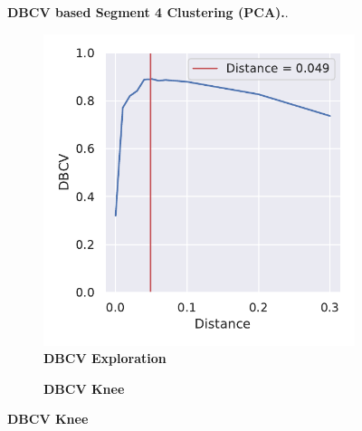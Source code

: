 \begin{figure}[!hbt]
\begin{subfigure}[b]{0.475\textwidth}
    \end{subfigure}
    \caption[\Acrshort{DBCV} based Segment 4 Clustering (\Acrshort{PCA})]{\textbf{\Acrshort{DBCV} based Segment 4 Clustering (\Acrshort{PCA}).}.}
    \label{fig:PCA_Cluster_DBCV_4}
\end{figure}

\begin{figure}[!hbt]
    \centering
    \begin{subfigure}[b]{0.475\textwidth}
        \caption[\Acrshort{DBCV} Exploration]{\textbf{\Acrshort{DBCV} Exploration}}
        \label{subfig:UMAP_Cluster_DBCV_Explo_4}            \includegraphics[width=\textwidth]{UMAP/Cluster_DBCV_Segment_4.pdf}
    \end{subfigure}
    \hfill
    \begin{subfigure}[b]{0.475\textwidth}
        \caption[\Acrshort{DBCV} Knee]{\textbf{\Acrshort{DBCV} Knee}}

\end{subfigure}
\end{figure}
